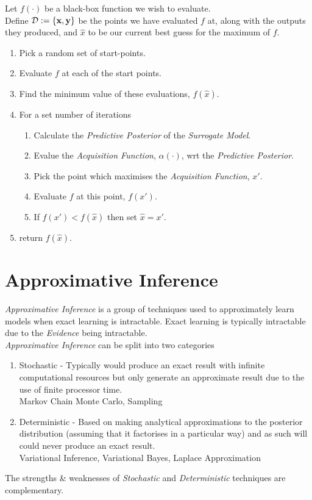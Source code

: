 \documentclass[11pt,a4paper]{article}
\begin{document}
Let $f(\cdot)$ be a black-box function we wish to evaluate.\\
Define $\mathcal{D}:=\{\textbf{x},\textbf{y}\}$ be the points we have evaluated $f$ at, along with the outputs they produced, and $\hat{x}$ to be our current best guess for the maximum of $f$.
\begin{enumerate}
	\item Pick a random set of start-points.
	\item Evaluate $f$ at each of the start points.
	\item Find the minimum value of these evaluations, $f(\hat{x})$.
	\item For a set number of iterations
		\begin{enumerate}
			\item Calculate the \textit{Predictive Posterior} of the \textit{Surrogate Model}.
			\item Evalue the \textit{Acquisition Function}, $\alpha(\cdot)$, wrt the \textit{Predictive Posterior}.
			\item Pick the point which maximises the \textit{Acquisition Function}, $x'$.
			\item Evaluate $f$ at this point, $f(x')$.
			\item If $f(x')<f(\hat{x})$ then set $\hat{x}=x'$.
		\end{enumerate}
	\item return $f(\hat{x})$.
\end{enumerate}

\section{Approximative Inference}

\textit{Approximative Inference} is a group of techniques used to approximately learn models when exact learning is intractable. Exact learning is typically intractable due to the \textit{Evidence} being intractable.\\
\textit{Approximative Inference} can be split into two categories
\begin{enumerate}
	\item Stochastic - Typically would produce an exact result with infinite computational resources but only generate an approximate result due to the use of finite processor time.\\
	\eg Markov Chain Monte Carlo, Sampling
	\item Deterministic - Based on making analytical approximations to the posterior distribution (\eg assuming that it factorises in a particular way) and as such will could never produce an exact result.\\
	\eg Variational Inference, Variational Bayes, Laplace Approximation
\end{enumerate}
\nb The strengths \& weaknesses of \textit{Stochastic} and \textit{Deterministic} techniques are complementary.\\
\end{document}
